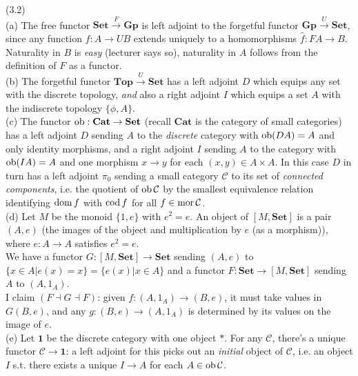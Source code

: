 \documentclass[a4paper]{article}
\begin{document}
\begin{eg} (3.2)\\
    (a) The free functor $\mathbf{Set} \xrightarrow{F} \mathbf{Gp}$ is left adjoint to the forgetful functor $\mathbf{Gp} \xrightarrow{U} \mathbf{Set}$, since any function $f:A \to UB$ extends uniquely to a homomorphisms $\hat{f}: FA \to B$.\\
    Naturality in $B$ is \emph{easy} (lecturer says so), naturality in $A$ follows from the definition of $F$ as a functor.\\
    (b) The forgetful functor $\mathbf{Top} \xrightarrow{U} \mathbf{Set}$ has a left adjoint $D$ which equips any set with the discrete topology, \emph{and} also a right adjoint $I$ which equips a set $A$ with the indiscrete topology $\{\phi,A\}$.\\
    (c) The functor $\operatorname{ob}: \mathbf{Cat} \to \mathbf{Set}$ (recall $\mathbf{Cat}$ is the category of small categories) has a left adjoint $D$ sending $A$ to the \emph{discrete} category with $\operatorname{ob}(DA) = A$ and only identity morphisms, and a right adjoint $I$ sending $A$ to the category with $\operatorname{ob}(IA) = A$ and one morphism $x \to y$ for each $(x,y) \in A \times A$. In this case $D$ in turn has a left adjoint $\pi_0$ sending a small category $\mathcal{C}$ to its set of \emph{connected components}, i.e. the quotient of $\operatorname{ob}\mathcal{C}$ by the smallest equivalence relation identifying $\operatorname{dom} f$ with $\operatorname{cod} f$ for all $f \in \operatorname{mor} \mathcal{C}$.\\
    (d) Let $M$ be the monoid $\{1,e\}$ with $e^2=e$. An object of $[M,\mathbf{Set}]$ is a pair $(A,e)$ (the images of the object and multiplication by $e$ (as a morphism)), where $e:A \to A$ satisfies $e^2=e$.\\
    We have a functor $G:[M,\mathbf{Set}] \to \mathbf{Set}$ sending $(A,e)$ to $\{x \in A | e(x) = x \} = \{e(x) | x \in A\}$ and a functor $F: \mathbf{Set} \to [M,\mathbf{Set}]$ sending $A$ to $(A,1_A)$.\\
    I claim $(F \dashv G \dashv F)$: given $f:(A,1_A) \to (B,e)$, it must take values in $G(B,e)$, and any $g:(B,e) \to (A,1_A)$ is determined by its values on the image of $e$.\\
    (e) Let $\mathbf{1}$ be the discrete category with one object $*$. For any $\mathcal{C}$, there's a unique functor $\mathcal{C} \to \mathbf{1}$: a left adjoint for this picks out an \emph{initial} object of $\mathcal{C}$, i.e. an object $I$ s.t. there exists a unique $I \to A$ for each $A \in \operatorname{ob} \mathcal{C}$.\\

\end{eg}
\end{document}
